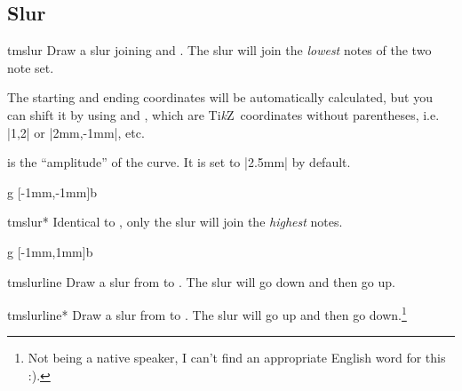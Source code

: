 \documentclass[11pt,a4paper]{ltxdoc}
\newcommand\tikzname{Ti\emph{k}Z}
\begin{document}
\subsection{Slur}\label{sec:line:slur-tie}
\begin{docCommand}{tmslur}{}
  Draw a slur joining  and . The slur will join the 
  \emph{lowest} notes of the two note set.
  
  The starting and ending 
  coordinates will be automatically calculated, but you can shift it by using 
   and , which are \tikzname\ coordinates without 
  parentheses, i.e. |1,2| or |2mm,-1mm|, etc.

   is the ``amplitude'' of the curve. It is set to |2.5mm| by 
  default.
\end{docCommand}
\begin{dispExample}
\begin{tmsinglestaff}
  \begin{tmstaff}{g}
    [-1mm,-1mm]{b}
  \end{tmstaff}
\end{tmsinglestaff}
\end{dispExample}
\begin{docCommand}{tmslur*}{}
  Identical to , only the slur will join the \emph{highest} notes.
\end{docCommand}
\begin{dispExample}
\begin{tmsinglestaff}
  \begin{tmstaff}{g}
    [-1mm,1mm]{b}
  \end{tmstaff}
\end{tmsinglestaff}
\end{dispExample}
\begin{docCommand}{tmslurline}{}
  Draw a slur from  to . The slur will go 
  down and then go up.
\end{docCommand}
\begin{docCommand}{tmslurline*}{}
  Draw a slur from  to . The slur will go 
  up and then go down.\footnote{Not being a native speaker, I can't find an 
  appropriate English word for this :).}
\end{docCommand}
\end{document}
